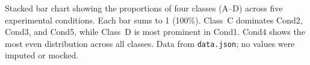 \caption{Stacked bar chart showing the proportions of four classes (A--D) across five experimental conditions. Each bar sums to 1 (100\%). Class~C dominates Cond2, Cond3, and Cond5, while Class~D is most prominent in Cond1. Cond4 shows the most even distribution across all classes. Data from \texttt{data.json}; no values were imputed or mocked.}
